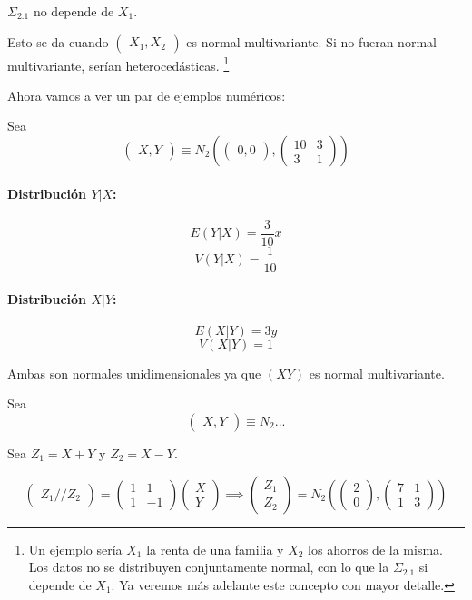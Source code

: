 \documentclass[nochap]{apuntes}
\begin{document}
\begin{defn}[Homocedástico]
$Σ_{2.1}$ no depende de $X_1$.

Esto se da cuando $\begin{pmatrix}X_1,X_2\end{pmatrix}$ es normal multivariante. Si no fueran normal multivariante, serían heterocedásticas. \footnote{Un ejemplo sería $X_1$ la renta de una familia y $X_2$ los ahorros de la misma. Los datos no se distribuyen conjuntamente normal, con lo que la $Σ_{2.1}$ si depende de $X_1$. Ya veremos más adelante este concepto con mayor detalle.}
\end{defn}


\begin{example}

Ahora vamos a ver un par de ejemplos numéricos:

Sea \[\begin{pmatrix}X,Y\end{pmatrix} \equiv N_2 \left( \begin{pmatrix}0,0\end{pmatrix}, \begin{pmatrix}10&3\\3&1\end{pmatrix} \right)\]
 
\paragraph{Distribución $Y|X$:}

\[E(Y|X) = \frac{3}{10}x\]
\[V(Y|X) = \frac{1}{10}\]

\paragraph{Distribución $X|Y$:}

\[E(X|Y) = 3y\]
\[V(X|Y) = 1\]

Ambas son normales unidimensionales ya que $(X Y)$ es normal multivariante.

Sea \[\begin{pmatrix}X,Y\end{pmatrix} \equiv N_2 ...\]

Sea $Z_1 = X+Y$ y $Z_2 = X-Y$.

\[
\begin{pmatrix}Z_1//Z_2\end{pmatrix} = \begin{pmatrix}1&1\\1&-1\end{pmatrix}\begin{pmatrix}X\\Y\end{pmatrix} \implies \begin{pmatrix}Z_1\\Z_2\end{pmatrix} = N_2\left(\begin{pmatrix}2\\0\end{pmatrix},\begin{pmatrix}7&1\\1&3\end{pmatrix}\right)
\]


\end{example}
\end{document}
